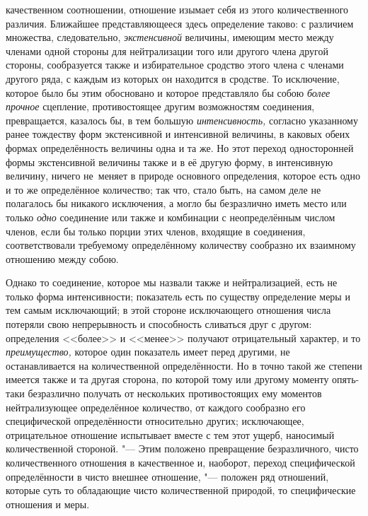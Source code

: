 качественном соотношении, отношение изымает себя из этого количественного
различия. Ближайшее представляющееся здесь определение таково: с различием
множества, следовательно, {\em экстенсивной} величины, имеющим место между
членами одной стороны для нейтрализации того или другого члена другой стороны,
сообразуется также и избирательное сродство этого члена с членами другого ряда,
с каждым из которых он находится в сродстве. То исключение, которое было бы
этим обосновано и которое представляло бы собою {\em более прочное} сцепление,
противостоящее другим возможностям соединения, превращается, казалось бы, в тем
большую {\em интенсивность,} согласно указанному ранее тождеству форм
экстенсивной и интенсивной величины, в каковых обеих формах определённость
величины одна и та же. Но этот переход односторонней формы экстенсивной
величины также и в её другую форму, в интенсивную величину, ничего не~меняет
в природе основного определения, которое есть одно и то же определённое
количество; так что, стало быть, на самом деле не полагалось бы никакого
исключения, а могло бы безразлично иметь место или только {\em одно} соединение
или также и комбинации с неопределённым числом членов, если бы только порции
этих членов, входящие в соединения, соответствовали требуемому определённому
количеству сообразно их взаимному отношению между собою.

Однако то соединение, которое мы назвали также и нейтрализацией, есть не только
форма интенсивности; показатель есть по существу определение меры и тем самым
исключающий; в этой стороне исключающего отношения числа потеряли свою
непрерывность и способность сливаться друг с другом: определения <<более>> и
<<менее>> получают отрицательный характер, и то {\em преимущество,} которое
один показатель имеет перед другими, не останавливается на количественной
определённости. Но в точно такой же степени имеется также и та другая сторона,
по которой тому или другому моменту опять-таки безразлично получать от
нескольких противостоящих ему моментов нейтрализующее определённое количество,
от каждого сообразно его специфической определённости относительно других;
исключающее, отрицательное отношение испытывает вместе с тем этот ущерб,
наносимый количественной стороной. "--- Этим положено превращение
безразличного, чисто количественного отношения в качественное и, наоборот,
переход специфической определённости в чисто внешнее отношение, "--- положен
ряд отношений, которые суть то обладающие чисто количественной природой, то
специфические отношения и меры.


